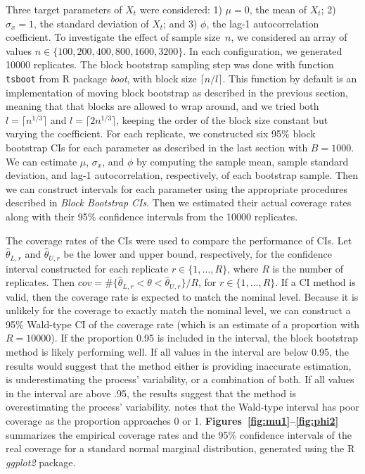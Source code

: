 \documentclass[10pt]{article}
\begin{document}
Three target parameters of $X_t$ were considered:
1) $\mu = 0$, the mean of $X_t$;
2) $\sigma_x = 1$, the standard deviation of $X_t$; and
3) $\phi$, the lag-1 autocorrelation coefficient.
To investigate the effect of sample size~$n$, we considered an array of values
$n \in \{100, 200, 400, 800, 1600, 3200\}$. In each configuration, we generated 
10000 replicates. The 
block bootstrap sampling step was done with function \texttt{tsboot} from R 
package \textsl{boot},\citep{boot} with block size $\lceil n / l \rceil$. This 
function by default is an implementation of moving block bootstrap as described 
in the previous section, meaning that that blocks are allowed to wrap around, 
and we tried both $l = \lceil n^{1/3} \rceil$ and $l = \lceil 2n^{1/3} \rceil$,
keeping the order of the block size constant but varying the coefficient. 
For each replicate, we constructed 
six 95\% block bootstrap 
CIs for each parameter as described in the last section with $B = 1000$. We can 
estimate $\mu$, 
$\sigma_x$, and $\phi$ by computing the sample mean, sample standard deviation, 
and lag-1 autocorrelation, respectively, of each bootstrap sample. Then we can 
construct intervals for each parameter using the appropriate procedures 
described in \textit{Block Bootstrap CIs}. 
Then we estimated their actual coverage 
rates along with their 95\% confidence intervals from the 10000 replicates. 


The coverage rates of the CIs were used to compare the performance of CIs. Let
$\hat\theta_{L, r}$ and $\hat\theta_{U, r}$ be the lower and upper bound,
respectively, for the confidence interval constructed for each replicate
$r \in \{1, \ldots, R\}$, where $R$ is the number of replicates. Then
$cov = \#\{\hat\theta_{L, r} < \theta < \hat\theta_{U, r} \}/R$, for
$r \in \{1, \ldots, R\}$. If a CI method is valid, then the coverage rate is
expected to match the nominal level. Because it is unlikely for the coverage to 
exactly match the nominal level, we can construct a 95\% Wald-type CI of the 
coverage rate 
(which is an estimate of a proportion with $R = 10000$). If the proportion 0.95 
is included in the interval, the block bootstrap method is likely performing 
well. If all values in the interval are below 0.95, the results would suggest 
that the method either is providing inaccurate estimation, is underestimating 
the process' variability, or a combination of both. If all values in the 
interval are above .95, the results suggest that the method is overestimating 
the process' variability. \citet{brown2001interval} notes that the Wald-type 
interval has poor coverage as the proportion approaches 0 or 1.
\textbf{Figures~\ref{fig:mu1}--\ref{fig:phi2}} 
summarizes the empirical coverage rates and the 95\% confidence intervals of the 
real coverage for a standard normal marginal distribution, generated using the 
R \textsl{ggplot2} package.\citep{ggplot2}
\end{document}
